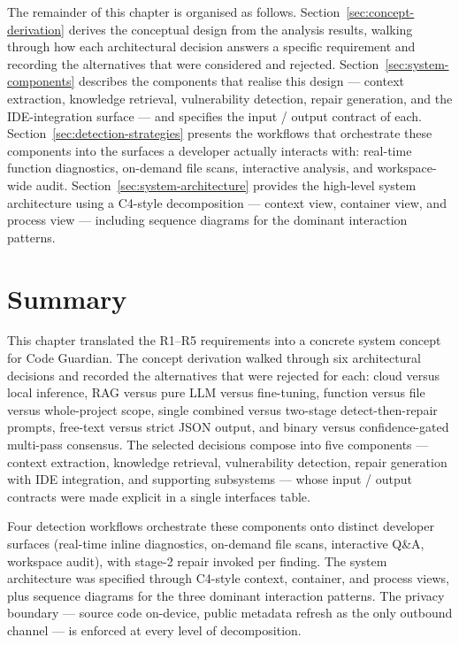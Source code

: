 The remainder of this chapter is organised as follows. Section~\ref{sec:concept-derivation} derives the conceptual design from the analysis results, walking through how each architectural decision answers a specific requirement and recording the alternatives that were considered and rejected. Section~\ref{sec:system-components} describes the components that realise this design --- context extraction, knowledge retrieval, vulnerability detection, repair generation, and the IDE-integration surface --- and specifies the input / output contract of each. Section~\ref{sec:detection-strategies} presents the workflows that orchestrate these components into the surfaces a developer actually interacts with: real-time function diagnostics, on-demand file scans, interactive analysis, and workspace-wide audit. Section~\ref{sec:system-architecture} provides the high-level system architecture using a C4-style decomposition --- context view, container view, and process view --- including sequence diagrams for the dominant interaction patterns.







\section{Summary}
\label{sec:concept-summary}

This chapter translated the R1--R5 requirements into a concrete system concept for Code Guardian. The concept derivation walked through six architectural decisions and recorded the alternatives that were rejected for each: cloud versus local inference, RAG versus pure LLM versus fine-tuning, function versus file versus whole-project scope, single combined versus two-stage detect-then-repair prompts, free-text versus strict JSON output, and binary versus confidence-gated multi-pass consensus. The selected decisions compose into five components --- context extraction, knowledge retrieval, vulnerability detection, repair generation with IDE integration, and supporting subsystems --- whose input / output contracts were made explicit in a single interfaces table.

Four detection workflows orchestrate these components onto distinct developer surfaces (real-time inline diagnostics, on-demand file scans, interactive Q\&A, workspace audit), with stage-2 repair invoked per finding. The system architecture was specified through C4-style context, container, and process views, plus sequence diagrams for the three dominant interaction patterns. The privacy boundary --- source code on-device, public metadata refresh as the only outbound channel --- is enforced at every level of decomposition.
